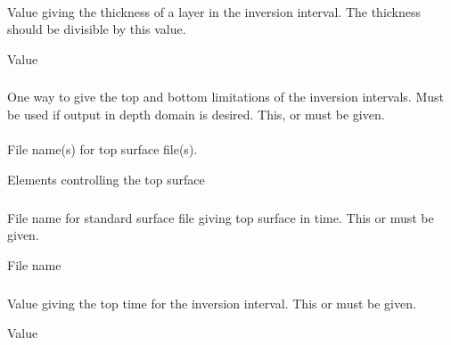\paragraph{}
 \slist
   \item \Description Value giving the thickness of a layer in the inversion interval. The thickness should be divisible by this value.
   \item \Argument Value
   \item \Default
 \elist

\subsubsection{} 
 \slist
   \item \Description One way to give the top and bottom limitations of the inversion intervals. Must be used if output in depth domain is desired. This,  or  must be given.
   \item \Argument
   \item \Default
 \elist

\paragraph{\necessary} 
 \slist
   \item \Description File name(s) for top surface file(s).
   \item \Argument Elements controlling the top surface
   \item \Default
 \elist

\subparagraph{} 
 \slist
   \item \Description File name for standard surface file giving top surface in time. This or  must be given.
   \item \Argument File name
   \item \Default
 \elist

\subparagraph{} 
 \slist
   \item \Description Value giving the top time for the inversion interval. This or  must be given.
   \item \Argument Value
   \item \Default
 \elist

